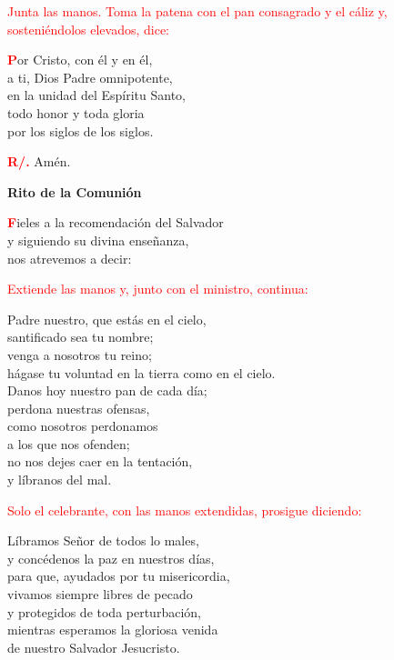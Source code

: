 \documentclass[12pt, letterpaper]{article}
\begin{document}
  \large{\textcolor{red}{Junta las manos. Toma la patena con el pan consagrado y el c\'aliz y, sosteni\'endolos elevados, dice:}}

  \lettrine[lines=2]{\bfseries \textcolor{red}{P}}{}\Large or Cristo, con \'el y en \'el,\\
  a ti, Dios Padre omnipotente,\\
  en la unidad del Esp\'iritu Santo,\\
  todo honor y toda gloria\\
  por los siglos de los siglos.

  \Large \hspace{-0.9cm} {\bfseries \textcolor{red}{R/.}} \hspace{0.5cm} Am\'en.

  \clearpage

  \begin{center}
    \Huge {\bfseries Rito de la Comuni\'on}
  \end{center}

  \lettrine[lines=2]{\bfseries \textcolor{red}{F}}{}\Large ieles a la recomendaci\'on del Salvador\\
  y siguiendo su divina ense\~nanza,\\
  nos atrevemos a decir:

  \large{\textcolor{red}{Extiende las manos y, junto con el ministro, continua:}}

  \noindent
  \Large Padre nuestro, que est\'as en el cielo,\\
  santificado sea tu nombre;\\
  venga a nosotros tu reino;\\
  h\'agase tu voluntad en la tierra como en el cielo.\\
  Danos hoy nuestro pan de cada d\'ia;\\
  perdona nuestras ofensas,\\
  como nosotros perdonamos\\
  a los que nos ofenden;\\
  no nos dejes caer en la tentaci\'on,\\
  y l\'ibranos del mal.

  \large{\textcolor{red}{Solo el celebrante, con las manos extendidas, prosigue diciendo:}}

  \noindent
  \Large L\'ibramos Se\~nor de todos lo males,\\ 
  y conc\'edenos la paz en nuestros d\'ias,\\ 
  para que, ayudados por tu misericordia,\\ 
  vivamos siempre libres de pecado\\ 
  y protegidos de toda perturbaci\'on,\\ 
  mientras esperamos la gloriosa venida\\ 
  de nuestro Salvador Jesucristo.
\end{document}
